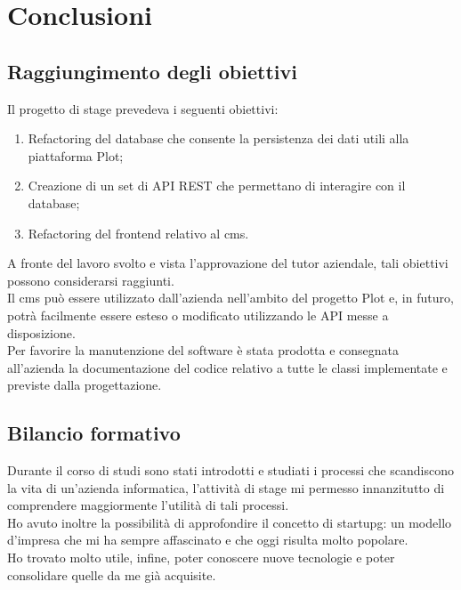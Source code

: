
\chapter{Conclusioni}
\label{cap:conclusioni}
\section{Raggiungimento degli obiettivi}
Il progetto di stage prevedeva i seguenti obiettivi:
\begin{enumerate}
	\item Refactoring del database che consente la persistenza dei dati utili alla piattaforma Plot;
	\item Creazione di un set di API REST che permettano di interagire con il database;
	\item Refactoring del \gls{frontend}\glsfirstoccur{} relativo al \gls{cms}\glsfirstoccur.
\end{enumerate}

A fronte del lavoro svolto e vista l'approvazione del tutor aziendale, tali obiettivi possono considerarsi raggiunti.\\
Il \gls{cms}\glsfirstoccur{} può essere utilizzato dall'azienda nell'ambito del progetto Plot e, in futuro, potrà facilmente essere esteso o modificato utilizzando le API messe a disposizione. \\
Per favorire la manutenzione del software è stata prodotta e consegnata all'azienda la documentazione del codice relativo a tutte le classi implementate e previste dalla progettazione.

\section{Bilancio formativo}
Durante il corso di studi sono stati introdotti e studiati i processi che scandiscono la vita di un'azienda informatica, l'attività di stage mi permesso innanzitutto di comprendere maggiormente l'utilità di tali processi. \\
Ho avuto inoltre la possibilità di approfondire il concetto di \gls{startupg}\glsfirstoccur{}: un modello d'impresa che mi ha sempre affascinato e che oggi risulta molto popolare. \\
Ho trovato molto utile, infine, poter conoscere nuove tecnologie e poter consolidare quelle da me già acquisite.
